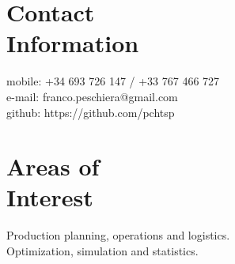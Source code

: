 
		\section{Contact\\Information}
                      
    	\hfill mobile: +34 693 726 147 / +33 767 466 727         \vspace{0mm}\\\vspace{0mm}%
    	\hfill e-mail: franco.peschiera@gmail.com  \vspace{0mm}\\\vspace{-4.5mm}%
        \hfill github: https://github.com/pchtsp  \vspace{0mm}\\\vspace{-4.5mm}%
        
		\section{Areas of \\Interest}

    Production planning, operations and logistics. \\
    Optimization, simulation and statistics.
		
